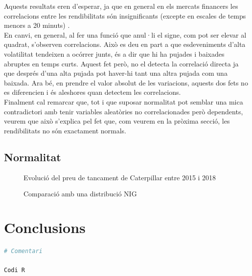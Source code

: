 \documentclass{article}
\numberwithin{table}{section}
\numberwithin{figure}{section}
\numberwithin{equation}{section}
\begin{document}
Aquests resultats eren d'esperar, ja que en general en els mercats financers les correlacions entre les rendibilitats són insignificants (excepte en escales de temps menors a 20 minuts) \cite{20}.\\
En canvi, en general, al fer una funció que anul·li el signe, com pot ser elevar al quadrat, s’observen correlacions. Això es deu en part a que esdeveniments d’alta volatilitat tendeixen a ocórrer junts, és a dir que hi ha pujades i baixades abruptes en temps curts. Aquest fet però, no el detecta la correlació directa ja que després d’una alta pujada pot haver-hi tant una altra pujada com una baixada. Ara bé, en prendre el valor absolut de les variacions, aquests dos fets no es diferencien i és aleshores quan detectem les correlacions.\\
Finalment cal remarcar que, tot i que suposar normalitat pot semblar una mica contradictori amb tenir variables aleatòries no correlacionades però dependents, veurem que això s’explica pel fet que, com veurem en la pròxima secció, les rendibilitats no són exactament normals.







\subsection{Normalitat}%




\begin{figure}[H]
	\centering \sffamily \small
	
	\caption{Evolució del preu de tancament de Caterpillar entre 2015 i 2018}
	\label{fig:distribucio rendibilitats}
\end{figure}
\begin{figure}[H]
	\centering \sffamily \small
	
	\caption{Comparació amb una distribució NIG}
	\label{fig:comparacio nig}
\end{figure}


\section{Conclusions}
\newpage







\begin{lstlisting}[language=R]
# Comentari

Codi R
\end{lstlisting}

%
%
\printbibliography[heading = biblio]
\end{document}
